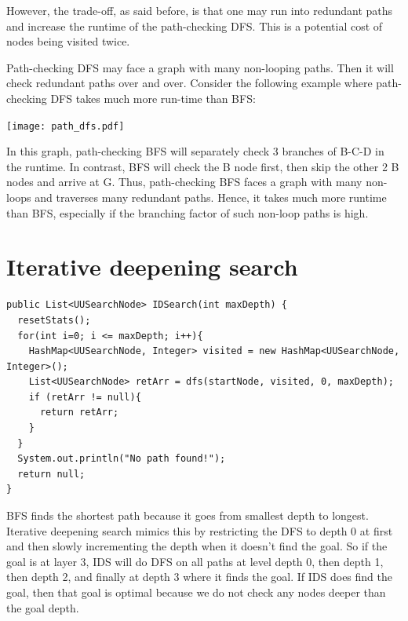 \documentclass[a4paper]{report}
\begin{document}
However, the trade-off, as said before, is that one may run into redundant paths and increase the runtime of
the path-checking DFS. This is a potential cost of nodes being visited twice. 

Path-checking DFS may face a graph with many non-looping paths. Then it will check redundant paths over and over.
Consider the following example where path-checking DFS takes much more run-time than BFS:

\hspace*{-2in}
\texttt{[image: path\_dfs.pdf]}

In this graph, path-checking BFS will separately check 3 branches of B-C-D in the runtime. In contrast, BFS will check
the B node first, then skip the other 2 B nodes and arrive at G. Thus, path-checking BFS faces a graph with many 
non-loops and traverses many redundant paths. Hence, it takes much more runtime than BFS, especially if the branching factor
of such non-loop paths is high. 

\section{Iterative deepening search}

\begin{lstlisting}
public List<UUSearchNode> IDSearch(int maxDepth) {
  resetStats();
  for(int i=0; i <= maxDepth; i++){
    HashMap<UUSearchNode, Integer> visited = new HashMap<UUSearchNode, Integer>();
    List<UUSearchNode> retArr = dfs(startNode, visited, 0, maxDepth);
    if (retArr != null){
      return retArr;
    }
  }
  System.out.println("No path found!");
  return null;
}
\end{lstlisting}

BFS finds the shortest path because it goes from smallest depth to longest. Iterative deepening search
mimics this by restricting the DFS to depth 0 at first and then slowly incrementing the depth when it doesn't
find the goal. So if the goal is at layer 3, IDS will do DFS on all paths at level depth 0, then depth 1, then
depth 2, and finally at depth 3 where it finds the goal. 
If IDS does find the goal, then that goal is optimal because we do not check any nodes deeper than the goal depth. 
\end{document}
